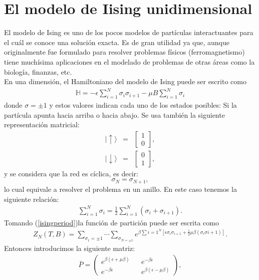 \documentclass[letterpaper,12pt,oneside]{book}
\begin{document}
\section{El modelo de Iising unidimensional}
%
El modelo de Ising es uno de los pocos modelos de part\'iculas interactuantes para el cu\'al se conoce una soluci\'on exacta. Es de gran utilidad ya que, aunque originalmente fue formulado para resolver problemas f\'isicos (ferromagnetismo) tiene much\'isima aplicaciones en el modelado de problemas de otras \'areas como la biolog\'ia, finanzas, etc.\\
En una dimensi\'on, el Hamiltoniano del modelo de Ising puede ser escrito como \\
%
\begin{eqnarray}
  \mathbb{H}=-\epsilon\sum_{i=1}^{N}\sigma_i\sigma_{i+1}-\mu B\sum_{i=1}^{N}\sigma_i \label{hamilIsing}
\end{eqnarray}
%
donde $\sigma=\pm1$ y estos valores indican cada uno de los estados posibles: Si la part\'icula apunta hacia arriba o hacia abajo. Se usa tambi\'en la siguiente representaci\'on matricial:
%
\begin{eqnarray}
  |\uparrow\rangle &=&\begin{bmatrix}1\\0\end{bmatrix}\label{spinup},\\
  |\downarrow\rangle&=&\begin{bmatrix}0\\1\end{bmatrix}\label{spindown},
\end{eqnarray}
%
y se considera que la red es c\'iclica, es decir:
%
$$
\sigma_{N}=\sigma_{N+1},
$$
%
lo cual equivale a resolver el problema en un anillo. En este caso tenemos la siguiente relaci\'on:
%
\begin{eqnarray}
 \sum_{i=1}^{N}\sigma_{i}=\frac{1}{2}\sum_{i=1}^{N}(\sigma_{i}+\sigma_{i+1}).\label{isingperiod}
\end{eqnarray}
%
Tomando (\ref{isingperiod})la funci\'on de partici\'on puede ser escrita como
%
\begin{eqnarray}
  Z_{N}(T,B)=\sum_{\sigma_{1}=\pm 1}\cdots\sum_{\sigma_{N=\pm 1}}e^{\beta\sum{i=1^N\left[\epsilon\sigma_{i}\sigma_{i+1}+\frac{1}{2}\mu \beta (\sigma_{i}\sigma{i+1}) \right]}} .\label{partising}
\end{eqnarray}
%
Entonces introducimos la siguiente matriz: 
%
\begin{eqnarray}
\bar P= \begin{pmatrix}
e^{\beta(\epsilon + \mu \beta )} && e^{-\beta \epsilon} \\
e^{-\beta \epsilon} && e^{\beta(\epsilon - \mu \beta )}
\end{pmatrix},\label{matrizP}
\end{eqnarray}
\end{document}
